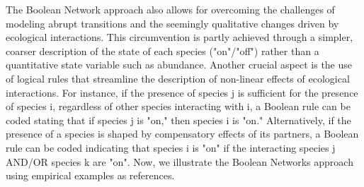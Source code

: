 \documentclass[10pt]{article}
\begin{document}
The Boolean Network approach also allows for overcoming the challenges of modeling abrupt transitions and the seemingly qualitative changes driven by ecological interactions. This circumvention is partly achieved through a simpler, coarser description of the state of each species ("on"/"off") rather than a quantitative state variable such as abundance. Another crucial aspect is the use of logical rules that streamline the description of non-linear effects of ecological interactions. For instance, if the presence of species j is sufficient for the presence of species i, regardless of other species interacting with i, a Boolean rule can be coded stating that if species j is "on," then species i is "on." Alternatively, if the presence of a species is shaped by compensatory effects of its partners, a Boolean rule can be coded indicating that species i is "on" if the interacting species j AND/OR species k are "on". Now, we illustrate the Boolean Networks approach using empirical examples as references.
\end{document}
